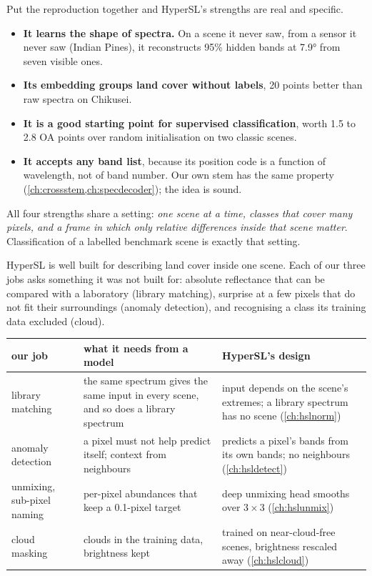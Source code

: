 Put the reproduction together and HyperSL's strengths are real and specific.
\begin{itemize}
\item \textbf{It learns the shape of spectra.} On a scene it never saw, from a sensor it never saw (Indian Pines), it
reconstructs 95\% hidden bands at 7.9° from seven visible ones.
\item \textbf{Its embedding groups land cover without labels}, 20 points better than raw spectra on Chikusei.
\item \textbf{It is a good starting point for supervised classification}, worth 1.5 to 2.8 OA points over random
initialisation on two classic scenes.
\item \textbf{It accepts any band list}, because its position code is a function of wavelength, not of band number.
Our own stem has the same property (\cref{ch:crossstem,ch:specdecoder}); the idea is sound.
\end{itemize}
All four strengths share a setting: \emph{one scene at a time, classes that cover many pixels, and a frame in which only
relative differences inside that scene matter}. Classification of a labelled benchmark scene is exactly that setting.

\begin{keypoint}
HyperSL is well built for describing land cover inside one scene. Each of our three jobs asks something it was not
built for: absolute reflectance that can be compared with a laboratory (library matching), surprise at a few pixels
that do not fit their surroundings (anomaly detection), and recognising a class its training data excluded (cloud).
\end{keypoint}

\begin{center}\small
\begin{tabular}{@{}>{\raggedright\arraybackslash}p{30mm}>{\raggedright\arraybackslash}p{52mm}>{\raggedright\arraybackslash}p{52mm}@{}}
\toprule
our job & what it needs from a model & HyperSL's design \\
\midrule
library matching & the same spectrum gives the same input in every scene, and so does a library spectrum &
input depends on the scene's extremes; a library spectrum has no scene (\cref{ch:hslnorm}) \\
anomaly detection & a pixel must not help predict itself; context from neighbours &
predicts a pixel's bands from its own bands; no neighbours (\cref{ch:hsldetect}) \\
unmixing, sub-pixel naming & per-pixel abundances that keep a 0.1-pixel target &
deep unmixing head smooths over $3\times3$ (\cref{ch:hslunmix}) \\
cloud masking & clouds in the training data, brightness kept &
trained on near-cloud-free scenes, brightness rescaled away (\cref{ch:hslcloud}) \\
\bottomrule
\end{tabular}
\end{center}


